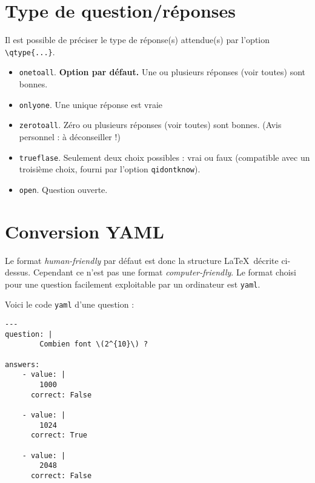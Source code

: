 \documentclass[12pt,a4paper]{article}
\begin{document}
\section{Type de question/réponses}

Il est possible de préciser le type de réponse(s) attendue(s) par l'option \verb|\qtype{...}|.

\begin{itemize}
  \item  \verb|onetoall|. \textbf{Option par défaut.} Une ou plusieurs réponses (voir toutes) sont bonnes.
  \item \verb|onlyone|. Une unique réponse est vraie
  \item \verb|zerotoall|. Zéro ou plusieurs réponses (voir toutes) sont bonnes. (Avis personnel : à déconseiller !)
  \item \verb|trueflase|. Seulement deux choix possibles : vrai ou faux (compatible avec un troisième choix, fourni par l'option \verb|qidontknow|).
  \item \verb|open|. Question ouverte.
\end{itemize}  
  







\section{Conversion YAML}


Le format \emph{human-friendly} par défaut est donc la structure \LaTeX\ décrite ci-dessus. Cependant ce n'est pas une format \emph{computer-friendly}. Le format choisi pour une question facilement exploitable par un ordinateur est \texttt{yaml}.

Voici le code \texttt{yaml} d'une question :
\begin{center}
\begin{minipage}{0.8\textwidth}
\begin{verbatim}
---
question: |
        Combien font \(2^{10}\) ?

answers: 
    - value: |
        1000
      correct: False

    - value: |
        1024
      correct: True

    - value: |
        2048
      correct: False
\end{verbatim}
\end{minipage}
\end{center}
\end{document}
